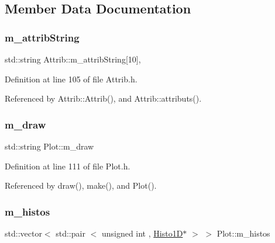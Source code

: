 \subsection{Member Data Documentation}
\mbox{\label{classAttrib_a3414521d7a82476e874b25a5407b5e63}} 
\subsubsection{\texorpdfstring{m\+\_\+attrib\+String}{m\_attribString}}
{\footnotesize\ttfamily std\+::string Attrib\+::m\+\_\+attrib\+String\mbox{[}10\mbox{]}\hspace{0.3cm}{\ttfamily [protected]}, {\ttfamily [inherited]}}



Definition at line 105 of file Attrib.\+h.



Referenced by Attrib\+::\+Attrib(), and Attrib\+::attributs().

\mbox{\label{classPlot_a83ffbf3effe6a2f8befa6375882f3994}} 
\subsubsection{\texorpdfstring{m\+\_\+draw}{m\_draw}}
{\footnotesize\ttfamily std\+::string Plot\+::m\+\_\+draw\hspace{0.3cm}{\ttfamily [private]}}



Definition at line 111 of file Plot.\+h.



Referenced by draw(), make(), and Plot().

\mbox{\label{classPlot_a7edebf2b275223b8ce55f6ef3b2da0cc}} 
\subsubsection{\texorpdfstring{m\+\_\+histos}{m\_histos}}
{\footnotesize\ttfamily std\+::vector$<$ std\+::pair $<$ unsigned int , \hyperlink{classHisto1D}{Histo1D}$\ast$ $>$ $>$ Plot\+::m\+\_\+histos\hspace{0.3cm}{\ttfamily [private]}}



